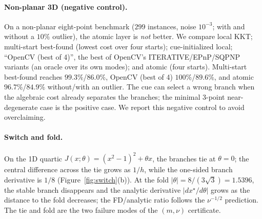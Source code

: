 \documentclass[conference]{IEEEtran}
\begin{document}
\begin{table}[t]
\centering
\caption{Minimal 3-point planar PnP ($500$ instances, normalized image noise $5\times10^{-4}$). Success: rotation error $<0.1$ rad. The cue is a noisy measurement of the true heading ($\sigma=0.25$); the random-cue row replaces it with a random unit vector. Oracle: best branch in the generator's candidate set.}
\label{tab:cue}
\setlength{\tabcolsep}{2.4pt}
\end{table}

\paragraph{Non-planar 3D (negative control).} On a non-planar eight-point benchmark ($299$ instances, noise $10^{-3}$; with and without a $10\%$ outlier), the atomic layer is \emph{not} better. We compare local KKT; multi-start best-found (lowest cost over four starts); cue-initialized local; ``OpenCV (best of 4)'', the best of OpenCV's ITERATIVE/EPnP/SQPNP variants (an oracle over its own modes); and atomic (four starts). Multi-start best-found reaches $99.3\%$/$86.0\%$, OpenCV (best of 4) $100\%$/$89.6\%$, and atomic $96.7\%$/$84.9\%$ without/with an outlier. The cue can select a wrong branch when the algebraic cost already separates the branches; the minimal 3-point near-degenerate case is the positive case. We report this negative control to avoid overclaiming.

\paragraph{Switch and fold.} On the 1D quartic $J(x;\theta)=(x^2-1)^2+\theta x$, the branches tie at $\theta=0$; the central difference across the tie grows as $1/h$, while the one-sided branch derivative is $1/8$ (Figure~\ref{fig:switch}(b)). At the fold $|\theta|=8/(3\sqrt3)=1.5396$, the stable branch disappears and the analytic derivative $|dx^\star/d\theta|$ grows as the distance to the fold decreases; the FD/analytic ratio follows the $\nu^{-1/2}$ prediction. The tie and fold are the two failure modes of the $(m,\nu)$ certificate.
\end{document}
